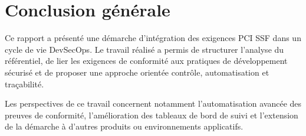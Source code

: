 \chapter*{Conclusion générale}

Ce rapport a présenté une démarche d'intégration des exigences PCI SSF dans un cycle de vie DevSecOps. Le travail réalisé a permis de structurer l'analyse du référentiel, de lier les exigences de conformité aux pratiques de développement sécurisé et de proposer une approche orientée contrôle, automatisation et traçabilité.

Les perspectives de ce travail concernent notamment l'automatisation avancée des preuves de conformité, l'amélioration des tableaux de bord de suivi et l'extension de la démarche à d'autres produits ou environnements applicatifs.

\clearpage

